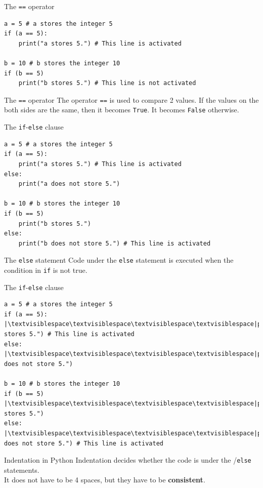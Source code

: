 \documentclass[dvipsnames, svgnames, x11names]{beamer}
\begin{document}
\begin{frame}[fragile]{The \texttt{==} operator}
\begin{verbatim}
a = 5 # a stores the integer 5
if (a == 5):
	print("a stores 5.") # This line is activated
	
b = 10 # b stores the integer 10
if (b == 5)
	print("b stores 5.") # This line is not activated
\end{verbatim}
\begin{block}{The \texttt{==} operator}
The operator \texttt{==} is used to compare 2 values. If the values on the both sides are the same, then it becomes {\color{blue}\texttt{True}}. It becomes {\color{blue}\texttt{False}} otherwise.
\end{block}
\end{frame}

\begin{frame}[fragile]{The \texttt{if}-\texttt{else} clause}
\begin{verbatim}
a = 5 # a stores the integer 5
if (a == 5):
	print("a stores 5.") # This line is activated
else:
	print("a does not store 5.") 
	
b = 10 # b stores the integer 10
if (b == 5)
	print("b stores 5.")
else:
	print("b does not store 5.") # This line is activated
\end{verbatim}
\begin{block}{The \texttt{else} statement}
Code under the \texttt{else} statement is executed when the condition in \texttt{if} is not true.
\end{block}
\end{frame}

\begin{frame}[fragile]{The \texttt{if}-\texttt{else} clause}
\begin{verbatim}
a = 5 # a stores the integer 5
if (a == 5):
|\textvisiblespace\textvisiblespace\textvisiblespace\textvisiblespace|print("a stores 5.") # This line is activated
else:
|\textvisiblespace\textvisiblespace\textvisiblespace\textvisiblespace|print("a does not store 5.") 
	
b = 10 # b stores the integer 10
if (b == 5)
|\textvisiblespace\textvisiblespace\textvisiblespace\textvisiblespace|print("b stores 5.")
else:
|\textvisiblespace\textvisiblespace\textvisiblespace\textvisiblespace|print("b does not store 5.") # This line is activated
\end{verbatim}
\begin{block}{Indentation in Python}
Indentation decides whether the code is under the /\texttt{else} statements.\\
It does not have to be 4 spaces, but they have to be \textbf{consistent}.
\end{block}
\end{frame}
\end{document}

